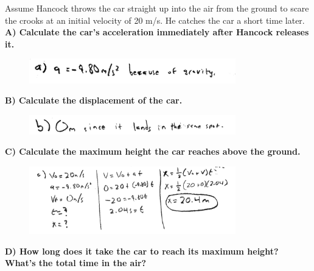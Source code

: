 \documentclass[a4paper,12pt]{article}
\begin{document}
Assume Hancock throws the car straight up into the air from the ground to scare the crooks at an initial velocity of 20 m/s. He catches the car a short time later. \\

\noindent\textbf{A) Calculate the car's acceleration immediately after Hancock releases it.} \\


\begin{figure}[H]
    \centering
    \includegraphics[width=0.8\textwidth]{U1_P2_A} %
\end{figure}


\noindent\textbf{B) Calculate the displacement of the car.} \\


\begin{figure}[H]
    \centering
    \includegraphics[width=0.8\textwidth]{U1_P2_B} %
\end{figure}

\noindent\textbf{C) Calculate the maximum height the car reaches above the ground.}\\ 


\begin{figure}[H]
    \centering
    \includegraphics[width=0.8\textwidth]{U1_P2_C} %
\end{figure}


\noindent\textbf{D) How long does it take the car to reach its maximum height? What's the total time in the air?} \\

\vspace{-0.2cm}
\end{document}
